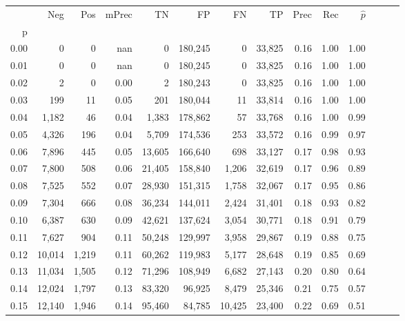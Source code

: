 \begin{tabular}{rrrrrrrrrrrrrr}
\toprule
{} &     Neg &    Pos & mPrec &       TN &       FP &      FN &      TP &  Prec &   Rec & $\hat{p}$ \\
p    &         &        &       &          &          &         &         &       &       &           \\
\midrule
0.00 &       0 &      0 &   nan &        0 &  180,245 &       0 &  33,825 &  0.16 &  1.00 &      1.00 \\
0.01 &       0 &      0 &   nan &        0 &  180,245 &       0 &  33,825 &  0.16 &  1.00 &      1.00 \\
0.02 &       2 &      0 &  0.00 &        2 &  180,243 &       0 &  33,825 &  0.16 &  1.00 &      1.00 \\
0.03 &     199 &     11 &  0.05 &      201 &  180,044 &      11 &  33,814 &  0.16 &  1.00 &      1.00 \\
0.04 &   1,182 &     46 &  0.04 &    1,383 &  178,862 &      57 &  33,768 &  0.16 &  1.00 &      0.99 \\
0.05 &   4,326 &    196 &  0.04 &    5,709 &  174,536 &     253 &  33,572 &  0.16 &  0.99 &      0.97 \\
0.06 &   7,896 &    445 &  0.05 &   13,605 &  166,640 &     698 &  33,127 &  0.17 &  0.98 &      0.93 \\
0.07 &   7,800 &    508 &  0.06 &   21,405 &  158,840 &   1,206 &  32,619 &  0.17 &  0.96 &      0.89 \\
0.08 &   7,525 &    552 &  0.07 &   28,930 &  151,315 &   1,758 &  32,067 &  0.17 &  0.95 &      0.86 \\
0.09 &   7,304 &    666 &  0.08 &   36,234 &  144,011 &   2,424 &  31,401 &  0.18 &  0.93 &      0.82 \\
0.10 &   6,387 &    630 &  0.09 &   42,621 &  137,624 &   3,054 &  30,771 &  0.18 &  0.91 &      0.79 \\
0.11 &   7,627 &    904 &  0.11 &   50,248 &  129,997 &   3,958 &  29,867 &  0.19 &  0.88 &      0.75 \\
0.12 &  10,014 &  1,219 &  0.11 &   60,262 &  119,983 &   5,177 &  28,648 &  0.19 &  0.85 &      0.69 \\
0.13 &  11,034 &  1,505 &  0.12 &   71,296 &  108,949 &   6,682 &  27,143 &  0.20 &  0.80 &      0.64 \\
0.14 &  12,024 &  1,797 &  0.13 &   83,320 &   96,925 &   8,479 &  25,346 &  0.21 &  0.75 &      0.57 \\
0.15 &  12,140 &  1,946 &  0.14 &   95,460 &   84,785 &  10,425 &  23,400 &  0.22 &  0.69 &      0.51 \\

\end{tabular}
